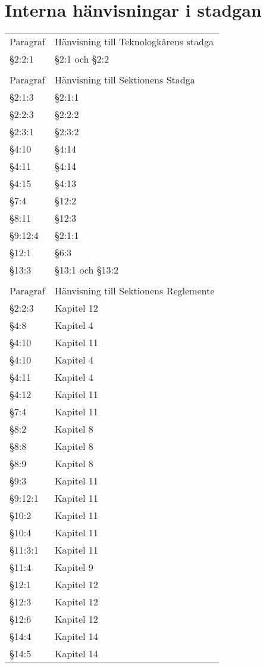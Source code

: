 \documentclass[10pt]{article}
\begin{document}
\section*{Interna hänvisningar i stadgan}
\renewcommand*\arraystretch{1}
\begin{tabular}{p{15mm} p{90mm}}
    Paragraf & Hänvisning till Teknologkårens stadga\\
    §2:2:1 & §2:1 och §2:2\\
    &\\
    Paragraf & Hänvisning till Sektionens Stadga\\
    §2:1:3 & §2:1:1\\
    §2:2:3 & §2:2:2\\
    §2:3:1 & §2:3:2\\
    §4:10 & §4:14\\
    §4:11 & §4:14\\
    §4:15 & §4:13\\
    §7:4 & §12:2\\
    §8:11 & §12:3\\
    §9:12:4 & §2:1:1\\
    §12:1 & §6:3\\
    §13:3 & §13:1 och §13:2\\
    &\\
    Paragraf & Hänvisning till Sektionens Reglemente\\
    §2:2:3 & Kapitel 12\\
    §4:8 & Kapitel 4\\
    §4:10 & Kapitel 11\\
    §4:10 & Kapitel 4\\
    §4:11 & Kapitel 4\\
    §4:12 & Kapitel 11\\
    §7:4 & Kapitel 11\\
    §8:2 & Kapitel 8\\
    §8:8 & Kapitel 8\\
    §8:9 & Kapitel 8\\
    §9:3 & Kapitel 11\\
    §9:12:1 & Kapitel 11\\
    §10:2 & Kapitel 11\\
    §10:4 & Kapitel 11\\
    §11:3:1 & Kapitel 11\\
    §11:4 & Kapitel 9\\
    §12:1 & Kapitel 12\\
    §12:3 & Kapitel 12\\
    §12:6 & Kapitel 12\\
    §14:4 & Kapitel 14\\
    §14:5 & Kapitel 14\\
\end{tabular}
\renewcommand*\arraystretch{1.3}
\end{document}
